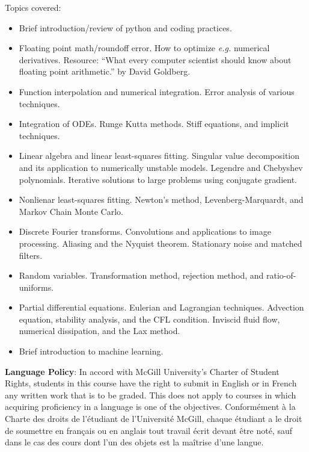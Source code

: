 \documentclass[12]{article}
\begin{document}
\vskip 0.1in
\noindent Topics covered:
\begin{itemize}
\item Brief introduction/review of python and coding practices.  

\item Floating point math/roundoff error.  How to optimize
  {\textit{e.g.}} numerical derivatives.  Resource: ``What every
  computer scientist should know about floating point arithmetic.'' by
  David Goldberg.  

\item Function interpolation and numerical integration.  Error
  analysis of various techniques. 

\item Integration of ODEs. Runge Kutta methods.  Stiff equations, and
  implicit techniques.

\item Linear algebra and linear least-squares fitting.  Singular value
  decomposition and its application to numerically unstable models.
  Legendre and Chebyshev polynomials.  Iterative solutions to large
  problems using conjugate gradient.

\item Nonlienar least-squares fitting.  Newton's method,
  Levenberg-Marquardt, and Markov Chain Monte Carlo.  

\item Discrete Fourier transforms.  Convolutions and applications to
  image processing.  Aliasing and the Nyquist theorem.  Stationary
  noise and matched filters. 

\item Random variables.  Transformation method, rejection method, and
  ratio-of-uniforms.  

\item Partial differential equations. Eulerian and Lagrangian
  techniques.  Advection equation, stability analysis, and the  CFL
  condition.  Inviscid fluid flow, numerical dissipation, and the Lax
  method.  

\item Brief introduction to machine learning.

\end{itemize}

\vskip 0.1in
\noindent
{\textbf{Language Policy}}:\newline
\noindent
In accord with McGill University’s Charter of Student Rights, students
in this course have the right to submit in English or in French any
written work that is to be graded. This does not apply to courses in
which acquiring proficiency in a language is one of the objectives.
\vskip 0.05in
\noindent
Conformément à la Charte des droits de l’étudiant de l’Université
McGill, chaque étudiant a le droit de soumettre en français ou en
anglais tout travail écrit devant être noté, sauf dans le cas des
cours dont l’un des objets est la maîtrise d’une langue. 
\vskip 0.1in
\end{document}
